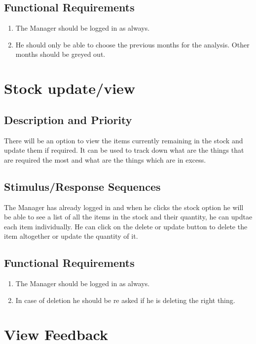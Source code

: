 \documentclass{scrreprt}
\begin{document}
\subsection{Functional Requirements}
\begin{enumerate}
    \item The Manager should be logged in as always.
    \item He should only be able to choose the previous months for the analysis. Other months should be greyed out.
\end{enumerate}

\section{Stock update/view}

\subsection{Description and Priority}
There will be an option to view the items currently remaining in the stock and update them if required. It can be used to track down what are the things that are required the most and what are the things which are in excess.

\subsection{Stimulus/Response Sequences}
The Manager has already logged in and when he clicks the stock option he will be able to see a list of all the items in the stock and their quantity, he can updtae each item individually. He can click on the delete or update button to delete the item altogether or update the quantity of it.

\subsection{Functional Requirements}
\begin{enumerate}
    \item The Manager should be logged in as always.
    \item In case of deletion he should be re asked if he is deleting the right thing.
\end{enumerate}

\section{View Feedback}
\end{document}
